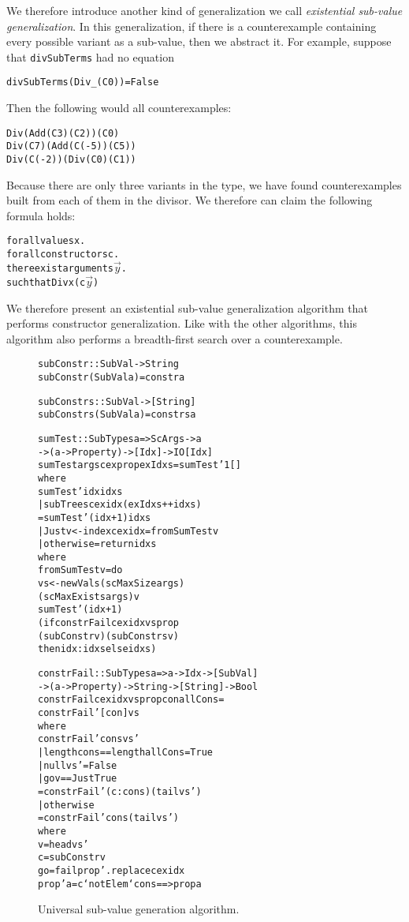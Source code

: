 \documentclass{sigplanconf}
\newenvironment{code}{\begin{alltt}\footnotesize}{\end{alltt}}
\newcommand{\ttp}[1]{\texttt{#1}}
\begin{document}
We therefore introduce another kind of generalization we call \emph{existential
  sub-value generalization}.  In this generalization, if there is a
counterexample containing every possible variant as a sub-value, then we
abstract it.  For example, suppose that \ttp{divSubTerms} had no equation
%
\begin{code}
divSubTerms (Div _ (C 0)) = False
\end{code}
%
\noindent
Then the following would all counterexamples:
%
\begin{code}
Div (Add (C 3) (C 2)) (C 0)
Div (C 7) (Add (C (-5)) (C 5))
Div (C (-2)) (Div (C 0) (C 1))
\end{code}
%
\noindent
Because there are only three variants in the type, we have found counterexamples
built from each of them in the divisor.  We therefore can claim the following
formula holds:
%
\begin{code}
forall values x .
  forall constructors c .
    there exist arguments \(\stackrel{\rightarrow}{y}\) .
      such that Div x (c\(\stackrel{\rightarrow}{y}\))
\end{code}
%
\noindent
We therefore present an existential sub-value generalization algorithm that
performs constructor generalization.  Like with the other algorithms, this
algorithm also performs a breadth-first search over a counterexample.

\begin{figure}
  \begin{code}
subConstr :: SubVal -> String
subConstr (SubVal a) = constr a

subConstrs :: SubVal -> [String]
subConstrs (SubVal a) = constrs a

sumTest :: SubTypes a => ScArgs -> a
  -> (a -> Property) -> [Idx] -> IO [Idx]
sumTest args cex prop exIdxs = sumTest' 1 []
  where
  sumTest' idx idxs
    | subTrees cex idx (exIdxs ++ idxs)
    = sumTest' (idx+1) idxs
    | Just v <- index cex idx = fromSumTest v
    | otherwise = return idxs
    where
    fromSumTest v = do
      vs <- newVals (scMaxSize args)
              (scMaxExists args) v
      sumTest' (idx+1)
        (if constrFail cex idx vs prop
           (subConstr v) (subConstrs v)
           then idx:idxs else idxs)

constrFail :: SubTypes a => a -> Idx -> [SubVal]
  -> (a -> Property) -> String -> [String] -> Bool
constrFail cex idx vs prop con allCons =
  constrFail' [con] vs
  where
  constrFail' cons vs'
    | length cons == length allCons = True
    | null vs'                      = False
    | go v == Just True
    = constrFail' (c:cons) (tail vs')
    | otherwise
    = constrFail' cons (tail vs')
    where
    v  = head vs'
    c  = subConstr v
    go = fail prop' . replace cex idx
    prop' a = c `notElem` cons ==> prop a
  \end{code}
  \caption{Universal sub-value generation algorithm.}
  \label{fig:constrs}
\end{figure}
\end{document}
